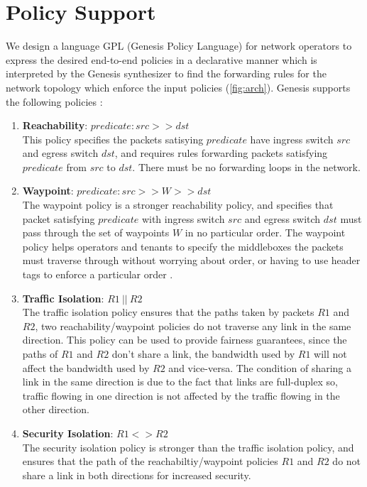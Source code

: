 \documentclass[]{sig}
\begin{document}
\section{Policy Support} \label{sec:policy}
We design a language GPL (Genesis Policy Language) for network operators to express the desired end-to-end policies in a declarative manner which is interpreted by the Genesis synthesizer to find the forwarding rules for the network topology which enforce the input policies (\cref{fig:arch}). Genesis supports the following policies : 
\begin{enumerate} 
	\item \textbf{Reachability}: $predicate : src >> dst$ \\
	This policy specifies the packets satisying $predicate$ have ingress switch $src$ and egress switch $dst$, and requires rules forwarding packets satisfying $predicate$ from $src$ to $dst$. There must be no forwarding loops in the network. 
	\item \textbf{Waypoint}: $predicate : src >> W >> dst$ \\
	The waypoint policy is a stronger reachability policy, and specifies that packet satisfying $predicate$ with ingress switch $src$ and egress switch $dst$ must pass through the set of waypoints $W$ in no particular order. The waypoint policy helps operators and tenants to specify the middleboxes the packets must traverse through without worrying about order, or having to use header tags to enforce a particular order \cite{flowtags}. 
	\item \textbf{Traffic Isolation}:  $R1 \ || \ R2$ \\
	The traffic isolation policy ensures that the paths taken by packets $R1$ and $R2$, two reachability/waypoint policies do not traverse any link in the same direction. This policy can be used to provide fairness guarantees, since the paths of $R1$ and $R2$ don't share a link, the bandwidth used by $R1$ will not affect the bandwidth used by $R2$ and vice-versa. The condition of sharing a link in the same direction is due to the fact that links are full-duplex so, traffic flowing in one direction is not affected by the traffic flowing in the other direction.
	\item \textbf{Security Isolation}: $R1 <> R2$ \\
	The security isolation policy is stronger than the traffic isolation policy, and ensures that the path of the reachabiltiy/waypoint policies $R1$ and $R2$ do not share a link in both directions for increased security.

\end{enumerate}
\end{document}
